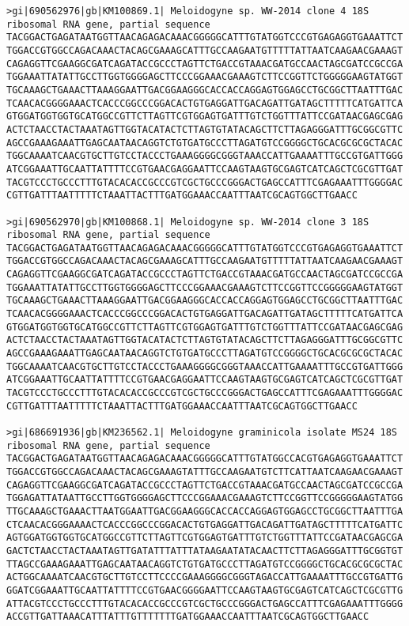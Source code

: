 \documentclass[11pt]{article}
\begin{document}
\begin{Verbatim}[commandchars=\\\{\}]
>gi|690562976|gb|KM100869.1| Meloidogyne sp. WW-2014 clone 4 18S ribosomal RNA gene, partial sequence
TACGGACTGAGATAATGGTTAACAGAGACAAACGGGGGCATTTGTATGGTCCCGTGAGAGGTGAAATTCT
TGGACCGTGGCCAGACAAACTACAGCGAAAGCATTTGCCAAGAATGTTTTTATTAATCAAGAACGAAAGT
CAGAGGTTCGAAGGCGATCAGATACCGCCCTAGTTCTGACCGTAAACGATGCCAACTAGCGATCCGCCGA
TGGAAATTATATTGCCTTGGTGGGGAGCTTCCCGGAAACGAAAGTCTTCCGGTTCTGGGGGAAGTATGGT
TGCAAAGCTGAAACTTAAAGGAATTGACGGAAGGGCACCACCAGGAGTGGAGCCTGCGGCTTAATTTGAC
TCAACACGGGGAAACTCACCCGGCCCGGACACTGTGAGGATTGACAGATTGATAGCTTTTTCATGATTCA
GTGGATGGTGGTGCATGGCCGTTCTTAGTTCGTGGAGTGATTTGTCTGGTTTATTCCGATAACGAGCGAG
ACTCTAACCTACTAAATAGTTGGTACATACTCTTAGTGTATACAGCTTCTTAGAGGGATTTGCGGCGTTC
AGCCGAAAGAAATTGAGCAATAACAGGTCTGTGATGCCCTTAGATGTCCGGGGCTGCACGCGCGCTACAC
TGGCAAAATCAACGTGCTTGTCCTACCCTGAAAGGGGCGGGTAAACCATTGAAAATTTGCCGTGATTGGG
ATCGGAAATTGCAATTATTTTCCGTGAACGAGGAATTCCAAGTAAGTGCGAGTCATCAGCTCGCGTTGAT
TACGTCCCTGCCCTTTGTACACACCGCCCGTCGCTGCCCGGGACTGAGCCATTTCGAGAAATTTGGGGAC
CGTTGATTTAATTTTTCTAAATTACTTTGATGGAAACCAATTTAATCGCAGTGGCTTGAACC

>gi|690562970|gb|KM100868.1| Meloidogyne sp. WW-2014 clone 3 18S ribosomal RNA gene, partial sequence
TACGGACTGAGATAATGGTTAACAGAGACAAACGGGGGCATTTGTATGGTCCCGTGAGAGGTGAAATTCT
TGGACCGTGGCCAGACAAACTACAGCGAAAGCATTTGCCAAGAATGTTTTTATTAATCAAGAACGAAAGT
CAGAGGTTCGAAGGCGATCAGATACCGCCCTAGTTCTGACCGTAAACGATGCCAACTAGCGATCCGCCGA
TGGAAATTATATTGCCTTGGTGGGGAGCTTCCCGGAAACGAAAGTCTTCCGGTTCCGGGGGAAGTATGGT
TGCAAAGCTGAAACTTAAAGGAATTGACGGAAGGGCACCACCAGGAGTGGAGCCTGCGGCTTAATTTGAC
TCAACACGGGGAAACTCACCCGGCCCGGACACTGTGAGGATTGACAGATTGATAGCTTTTTCATGATTCA
GTGGATGGTGGTGCATGGCCGTTCTTAGTTCGTGGAGTGATTTGTCTGGTTTATTCCGATAACGAGCGAG
ACTCTAACCTACTAAATAGTTGGTACATACTCTTAGTGTATACAGCTTCTTAGAGGGATTTGCGGCGTTC
AGCCGAAAGAAATTGAGCAATAACAGGTCTGTGATGCCCTTAGATGTCCGGGGCTGCACGCGCGCTACAC
TGGCAAAATCAACGTGCTTGTCCTACCCTGAAAGGGGCGGGTAAACCATTGAAAATTTGCCGTGATTGGG
ATCGGAAATTGCAATTATTTTCCGTGAACGAGGAATTCCAAGTAAGTGCGAGTCATCAGCTCGCGTTGAT
TACGTCCCTGCCCTTTGTACACACCGCCCGTCGCTGCCCGGGACTGAGCCATTTCGAGAAATTTGGGGAC
CGTTGATTTAATTTTTCTAAATTACTTTGATGGAAACCAATTTAATCGCAGTGGCTTGAACC

>gi|686691936|gb|KM236562.1| Meloidogyne graminicola isolate MS24 18S ribosomal RNA gene, partial sequence
TACGGACTGAGATAATGGTTAACAGAGACAAACGGGGGCATTTGTATGGCCACGTGAGAGGTGAAATTCT
TGGACCGTGGCCAGACAAACTACAGCGAAAGTATTTGCCAAGAATGTCTTCATTAATCAAGAACGAAAGT
CAGAGGTTCGAAGGCGATCAGATACCGCCCTAGTTCTGACCGTAAACGATGCCAACTAGCGATCCGCCGA
TGGAGATTATAATTGCCTTGGTGGGGAGCTTCCCGGAAACGAAAGTCTTCCGGTTCCGGGGGAAGTATGG
TTGCAAAGCTGAAACTTAATGGAATTGACGGAAGGGCACCACCAGGAGTGGAGCCTGCGGCTTAATTTGA
CTCAACACGGGAAAACTCACCCGGCCCGGACACTGTGAGGATTGACAGATTGATAGCTTTTTCATGATTC
AGTGGATGGTGGTGCATGGCCGTTCTTAGTTCGTGGAGTGATTTGTCTGGTTTATTCCGATAACGAGCGA
GACTCTAACCTACTAAATAGTTGATATTTATTTATAAGAATATACAACTTCTTAGAGGGATTTGCGGTGT
TTAGCCGAAAGAAATTGAGCAATAACAGGTCTGTGATGCCCTTAGATGTCCGGGGCTGCACGCGCGCTAC
ACTGGCAAAATCAACGTGCTTGTCCTTCCCCGAAAGGGGCGGGTAGACCATTGAAAATTTGCCGTGATTG
GGATCGGAAATTGCAATTATTTTCCGTGAACGGGGAATTCCAAGTAAGTGCGAGTCATCAGCTCGCGTTG
ATTACGTCCCTGCCCTTTGTACACACCGCCCGTCGCTGCCCGGGACTGAGCCATTTCGAGAAATTTGGGG
ACCGTTGATTAAACATTTATTTGTTTTTTTGATGGAAACCAATTTAATCGCAGTGGCTTGAACC


\end{Verbatim}
\end{document}
